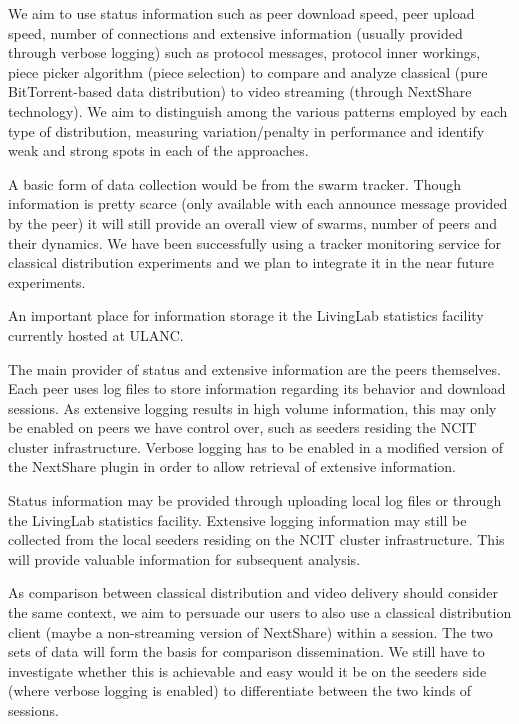 We aim to use status information such as peer download speed, peer upload
speed, number of connections and extensive information (usually provided
through verbose logging) such as protocol messages, protocol inner workings,
piece picker algorithm (piece selection) to compare and analyze classical
(pure BitTorrent-based data distribution) to video streaming (through
NextShare technology). We aim to distinguish among the various patterns
employed by each type of distribution, measuring variation/penalty in
performance and identify weak and strong spots in each of the approaches.

A basic form of data collection would be from the swarm tracker. Though
information is pretty scarce (only available with each announce message
provided by the peer) it will still provide an overall view of swarms, number
of peers and their dynamics. We have been successfully using a tracker
monitoring service for classical distribution experiments and we plan to
integrate it in the near future experiments.

An important place for information storage it the LivingLab statistics
facility currently hosted at ULANC.

The main provider of status and extensive information are the peers
themselves. Each peer uses log files to store information regarding its
behavior and download sessions. As extensive logging results in high volume
information, this may only be enabled on peers we have control over, such as
seeders residing the NCIT cluster infrastructure. Verbose logging has to be
enabled in a modified version of the NextShare plugin in order to allow
retrieval of extensive information.

Status information may be provided through uploading local log files or
through the LivingLab statistics facility. Extensive logging information may
still be collected from the local seeders residing on the NCIT cluster
infrastructure. This will provide valuable information for subsequent
analysis.

As comparison between classical distribution and video delivery should
consider the same context, we aim to persuade our users to also use a
classical distribution client (maybe a non-streaming version of NextShare)
within a session. The two sets of data will form the basis for comparison
dissemination. We still have to investigate whether this is achievable and
easy would it be on the seeders side (where verbose logging is enabled) to
differentiate between the two kinds of sessions.

